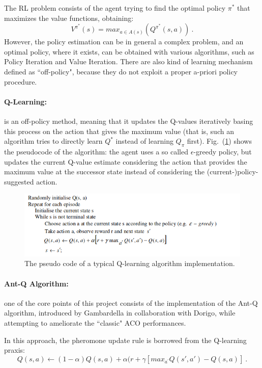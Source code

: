 \documentclass[10pt]{article}
\begin{document}
The RL problem consists of the agent trying to find the optimal policy $\pi^*$ that maximizes the value  functions, obtaining:
\begin{equation}
V^{\pi^*}(s)= max_{a \in A(s)}(Q^{\pi^*}(s,a))~.
\end{equation} 
However, the policy estimation can be in general a complex problem, and an optimal policy, where it exists, can be obtained with various algorithms, such as Policy Iteration and Value Iteration. There are also kind of learning mechanism defined as ``off-policy", because they do not exploit a proper a-priori policy procedure.

\paragraph{Q-Learning:} 
is  an  off-policy  method, meaning  that  it updates the Q-values iteratively basing this process on  the  action that  gives  the  maximum  value  (that is, such an algorithm tries to directly  learn $Q^*$  instead  of  learning $Q_\pi$ first). Fig.~(\ref{fig:q_pseudo}) shows the pseudocode of the algorithm:  the  agent  uses  a  so called $\epsilon$-greedy  policy,  but  updates the  current  Q-value  estimate  considering the  action  that  provides  the  maximum  value  at  the successor state instead of considering the (current-)policy-suggested action. 
\begin{figure}
\centering \includegraphics[scale=0.6]{figs/q_pseudo.png}
\caption{\label{fig:q_pseudo} The pseudo code of a typical Q-learning algorithm implementation.}
\end{figure}

\paragraph{Ant-Q Algorithm:}
one of the core points of this project consists of the implementation of the Ant-Q algorithm, introduced by Gambardella in collaboration with Dorigo\cite{undici}, while attempting to ameliorate the ``classic" ACO performances.  

In this approach, the pheromone update rule is borrowed from the Q-learning praxis:
\begin{equation}
Q(s,a) \leftarrow (1-\alpha) Q(s,a) + \alpha (r + \gamma [max_{a^{'}} Q(s',a')-Q(s,a)]~.
\label{eq:q-eq}
\end{equation}
\end{document}
